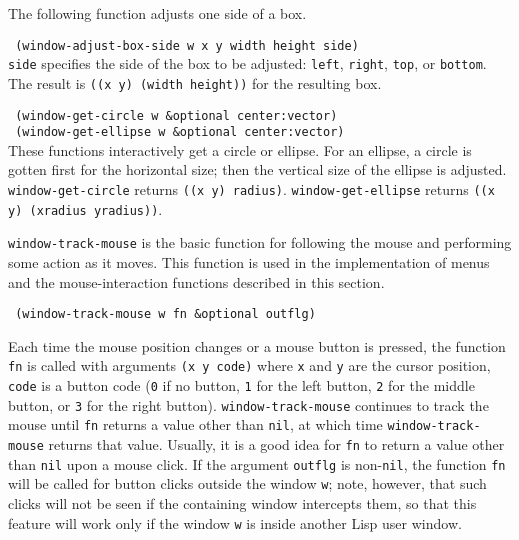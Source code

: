 The following function adjusts one side of a box.

{\tt \hspace*{0.5in} (window-adjust-box-side w x y width height side)} \\

\vspace{-0.15in}
{\tt side} specifies the side of the box to be adjusted: {\tt left},
{\tt right}, {\tt top}, or {\tt bottom}.  The result is
{\tt ((x y) (width height))} for the resulting box.

{\tt \hspace*{0.5in} (window-get-circle w \&optional center:vector)} \\
{\tt \hspace*{0.5in} (window-get-ellipse w \&optional center:vector)} \\
These functions interactively get a circle or ellipse.  For an ellipse,
a circle is gotten first for the horizontal size; then the vertical
size of the ellipse is adjusted.
{\tt window-get-circle} returns {\tt ((x y) radius)}.
{\tt window-get-ellipse} returns {\tt ((x y) (xradius yradius))}.


{\tt window-track-mouse} is the basic function for following the mouse
and performing some action as it moves.  This function is used in
the implementation of menus and the mouse-interaction functions described in
this section.

{\tt \hspace*{0.5in} (window-track-mouse w fn \&optional outflg)}

\vspace{-0.05in}
Each time the mouse position changes or a mouse button is pressed,
the function {\tt fn} is called with
arguments {\tt (x y code)} where {\tt x} and {\tt y} are the cursor
position, {\tt code} is a button code ({\tt 0} if no button, {\tt 1} for
the left button, {\tt 2} for the middle button, or {\tt 3} for the right
button).  {\tt window-track-mouse} continues to track the mouse until {\tt fn}
returns a value other than {\tt nil}, at which time {\tt window-track-mouse}
returns that value.  Usually, it is a good idea for {\tt fn} to return a
value other than {\tt nil} upon a mouse click.  If the argument {\tt outflg}
is non-{\tt nil}, the function {\tt fn} will be called for button clicks
outside the window {\tt w}; note, however, that such clicks will not be
seen if the containing window intercepts them, so that this feature will
work only if the window {\tt w} is inside another Lisp user window.



